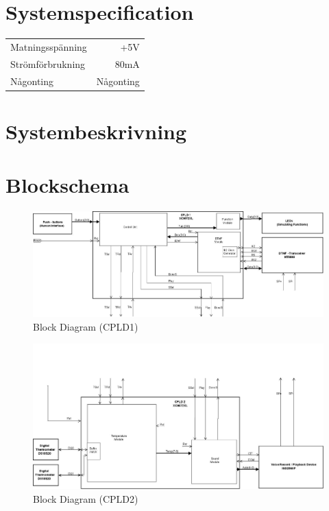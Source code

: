 \documentclass[a4paper,11pt]{article}
\begin{document}
\section{Systemspecification}

	\begin{tabular}{ l r}
	   Matningsspänning & +5V\\
	   Strömförbrukning & ~80mA\\
	   Någonting & Någonting\\
	\end{tabular}

\section{Systembeskrivning}

\section{Blockschema}

	\begin{figure}[h!]
	  \centering
	      \includegraphics[scale=0.48, angle=90]{BlockDiagramCPLD1.jpg}
	  	\caption{Block Diagram (CPLD1)}
	\end{figure}

	\begin{figure}[h!]
	  \centering
	      \includegraphics[scale=0.48, angle=90]{BlockDiagramCPLD2.jpg}
	  	\caption{Block Diagram (CPLD2)}
	\end{figure}
\end{document}
